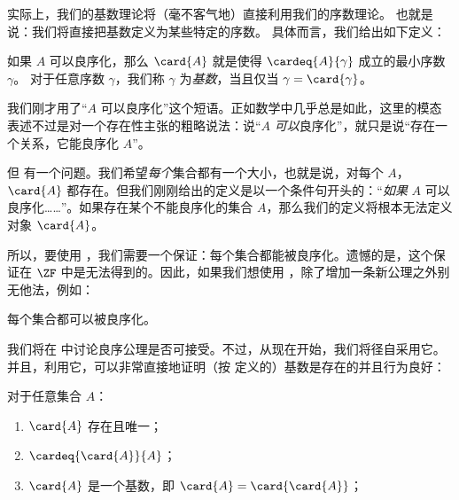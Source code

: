 \documentclass[../../../include/open-logic-section]{subfiles}
\begin{document}

实际上，我们的基数理论将（毫不客气地）直接利用我们的序数理论。
也就是说：我们将直接把基数定义为某些特定的序数。
具体而言，我们给出如下定义：

\begin{defn}
如果 $A$ 可以良序化，那么 $\card{A}$ 就是使得 $\cardeq{A}{\gamma}$ 成立的最小序数 $\gamma$。
对于任意序数 $\gamma$，我们称 $\gamma$ 为\emph{基数}，当且仅当 $\gamma = \card{\gamma}$。
\end{defn}

我们刚才用了“$A$ 可以良序化”这个短语。正如数学中几乎总是如此，这里的模态表述不过是对一个存在性主张的粗略说法：说“$A$ \emph{可以}良序化”，就只是说“存在一个关系，它能良序化 $A$”。

但  有一个问题。我们希望\emph{每个}集合都有一个大小，也就是说，对每个 $A$，$\card{A}$ 都存在。但我们刚刚给出的定义是以一个条件句开头的：“\emph{如果} $A$ 可以良序化……”。如果存在某个不能良序化的集合 $A$，那么我们的定义将根本无法定义对象 $\card{A}$。

所以，要使用 ，我们需要一个保证：每个集合都能被良序化。遗憾的是，这个保证在 $\ZF$ 中是无法得到的。因此，如果我们想使用 ，除了增加一条新公理之外别无他法，例如：

\begin{axiom}[良序公理]
每个集合都可以被良序化。
\end{axiom}

我们将在  中讨论良序公理是否可接受。不过，从现在开始，我们将径自采用它。并且，利用它，可以非常直接地证明（按  定义的）基数是存在的并且行为良好：

\begin{lem}
对于任意集合 $A$：
\begin{enumerate}
	\item{} $\card{A}$ 存在且唯一；
	\item{}  $\cardeq{\card{A}}{A}$；
	\item{}  $\card{A}$ 是一个基数，即
	$\card{A} = \card{\card{A}}$；
\end{enumerate}
\end{lem}
\end{document}
